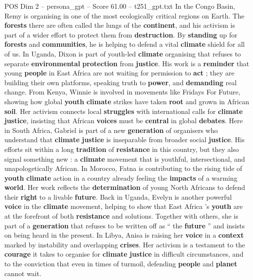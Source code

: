 \begin{textsample}{POS Dim 2 – persona\_gpt – Score 61.00 – t251\_gpt.txt}
In the Congo Basin, Remy is organising in one of the most ecologically critical regions on Earth.
The \textbf{forests} there are often called the lungs of the \textbf{continent}, and his activism is part of a wider effort to protect them from \textbf{destruction}.
By \textbf{standing} up for \textbf{forests} and \textbf{communities}, he is helping to defend a vital \textbf{climate} shield for all of us.
In Uganda, Dixon is part of youth-led \textbf{climate} organising that refuses to separate \textbf{environmental} \textbf{protection} from \textbf{justice}.
His work is a \textbf{reminder} that young \textbf{people} in East Africa are not waiting for permission to \textbf{act} ; they are building their own platforms, speaking truth to \textbf{power}, and \textbf{demanding} real change.
From Kenya, Winnie is involved in movements like Fridays For Future, showing how global \textbf{youth} \textbf{climate} strikes have taken \textbf{root} and grown in African \textbf{soil}.
Her activism connects local \textbf{struggles} with international calls for \textbf{climate} \textbf{justice}, insisting that African \textbf{voices} must be \textbf{central} in global \textbf{debates}.
Here in South Africa, Gabriel is part of a new \textbf{generation} of organisers who understand that \textbf{climate} \textbf{justice} is inseparable from broader social \textbf{justice}.
His efforts sit within a long \textbf{tradition} of \textbf{resistance} in this country, but they also signal something new : a \textbf{climate} movement that is youthful, intersectional, and unapologetically African.
In Morocco, Fatna is contributing to the rising tide of \textbf{youth} \textbf{climate} action in a country already feeling the \textbf{impacts} of a warming \textbf{world}.
Her work reflects the \textbf{determination} of young North Africans to defend their \textbf{right} to a livable \textbf{future}.
Back in Uganda, Evelyn is another powerful \textbf{voice} in the \textbf{climate} movement, helping to show that East Africa ’s \textbf{youth} are at the forefront of both \textbf{resistance} and solutions.
Together with others, she is part of a \textbf{generation} that refuses to be written off as “ the \textbf{future} ” and insists on being heard in the present.
In Libya, Anisa is raising her \textbf{voice} in a \textbf{context} marked by instability and overlapping \textbf{crises}.
Her activism is a testament to the \textbf{courage} it takes to organise for \textbf{climate} \textbf{justice} in difficult circumstances, and to the conviction that even in times of turmoil, defending \textbf{people} and \textbf{planet} cannot wait.

\end{textsample}
